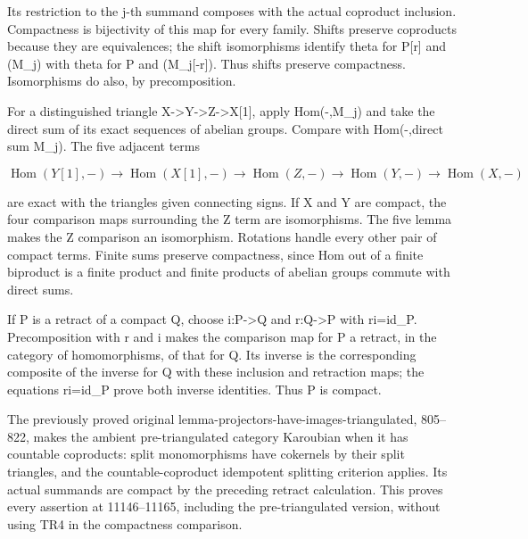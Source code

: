 \documentclass[11pt]{article}
\begin{document}
Its restriction to the j-th summand composes with the actual coproduct inclusion. Compactness is bijectivity of this map for every family. Shifts preserve coproducts because they are equivalences; the shift isomorphisms identify theta for P[r]\allowbreak{} and (M\_\allowbreak{}j)\allowbreak{} with theta for P and (M\_\allowbreak{}j[-r]\allowbreak{})\allowbreak{}. Thus shifts preserve compactness. Isomorphisms do also,\allowbreak{} by precomposition.

For a distinguished triangle X\allowbreak{}->Y\allowbreak{}->Z\allowbreak{}->X[1]\allowbreak{},\allowbreak{} apply Hom(-,\allowbreak{}M\_\allowbreak{}j)\allowbreak{} and take the direct sum of its exact sequences of abelian groups. Compare with Hom(-,\allowbreak{}direct sum M\_\allowbreak{}j)\allowbreak{}. The five adjacent terms

\[
 \operatorname{Hom}(Y[1],-)\longrightarrow
 \operatorname{Hom}(X[1],-)\longrightarrow
 \operatorname{Hom}(Z,-)\longrightarrow
 \operatorname{Hom}(Y,-)\longrightarrow
 \operatorname{Hom}(X,-)
\]

are exact with the triangle\textquotesingle s given connecting signs. If X and Y are compact,\allowbreak{} the four comparison maps surrounding the Z term are isomorphisms. The five lemma makes the Z comparison an isomorphism. Rotations handle every other pair of compact terms. Finite sums preserve compactness,\allowbreak{} since Hom out of a finite biproduct is a finite product and finite products of abelian groups commute with direct sums.

If P is a retract of a compact Q,\allowbreak{} choose i:\allowbreak{}P\allowbreak{}->Q and r:\allowbreak{}Q\allowbreak{}->P with ri\allowbreak{}=id\_\allowbreak{}P. Precomposition with r and i makes the comparison map for P a retract,\allowbreak{} in the category of homomorphisms,\allowbreak{} of that for Q. Its inverse is the corresponding composite of the inverse for Q with these inclusion and retraction maps; the equations ri\allowbreak{}=id\_\allowbreak{}P prove both inverse identities. Thus P is compact.

The previously proved original lemma-projectors-have-images-triangulated,\allowbreak{} 805–\allowbreak{}822,\allowbreak{} makes the ambient pre-triangulated category Karoubian when it has countable coproducts:\allowbreak{} split monomorphisms have cokernels by their split triangles,\allowbreak{} and the countable-coproduct idempotent splitting criterion applies. Its actual summands are compact by the preceding retract calculation. This proves every assertion at 11146–\allowbreak{}11165,\allowbreak{} including the pre-triangulated version,\allowbreak{} without using TR4 in the compactness comparison.
\end{document}
